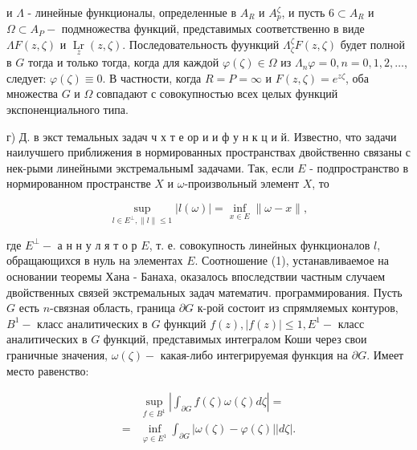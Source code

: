 \documentclass[10pt]{article}
\begin{document}
и $\Lambda$ - линейные функционалы, определенные в $A_{R}$ и $A_{p}^{\zeta}$, и пусть $6 \subset A_{R}$ и $\Omega \subset A_{P}-$ подмножества функций, представимых соответственно в виде $\Lambda F(z, \zeta)$ и $\underset{z}{\operatorname{Lr}}(z, \zeta)$. Последовательность фуункций $\Lambda_{\zeta}^{\zeta} F(z, \zeta)$ будет полной в $G$ тогда и только тогда, когда для каждой $\varphi(\zeta) \in \Omega$ из $\Lambda_{n} \varphi=0, n=0,1,2, \ldots$, следует: $\varphi(\zeta) \equiv 0$. В частности, когда $R=P=\infty$ и $F(z, \zeta)=e^{z \zeta}$, оба множества $G$ и $\Omega$ совпадают с совокупностью всех целых функций экспоненциального типа.



г) Д. в экст темальных задач ч х т е ор и и ф у н к ц и й. Известно, что задачи наилучшего приближения в нормированных пространствах двойственно связаны с нек-рыми линейными экстремальнымІ задачами. Так, если $E$ - подпространство в нормированном пространстве $X$ и $\omega$-произвольный элемент $X$, то



\[

\sup _{l \in E^{\perp},\|l\| \leqslant 1}|l(\omega)|=\inf _{x \in E}\|\omega-x\|,

\]



где $E^{\perp}-$ а н н у л я т о р $E$, т. е. совокупность линейных функционалов $l$, обращающихся в нуль на элементах $E$. Соотношение (1), устанавливаемое на основании теоремы Хана - Банаха, оказалось впоследствии частным случаем двойственных связей экстремальных задач математич. программирования. Пусть $G$ есть $n$-связная область, граница $\partial G$ к-рой состоит из спрямляемых контуров, $B^{1}-$ класс аналитических в $G$ функций $f(z),|f(z)| \leqslant 1, E^{1}-$ класс аналитических в $G$ функций, представимых интегралом Коши через свои граничные значения, $\omega(\zeta)-$ какая-либо интегрируемая функция на $\partial G$. Имеет место равенство:



\[

\begin{aligned}

& \sup _{f \in B^{1}}\left|\int_{\partial G} f(\zeta) \omega(\zeta) d \zeta\right|= \\

= & \inf _{\varphi \in E^{1}} \int_{\partial G}|\omega(\zeta)-\varphi(\zeta)||d \zeta| .

\end{aligned}

\]
\end{document}
